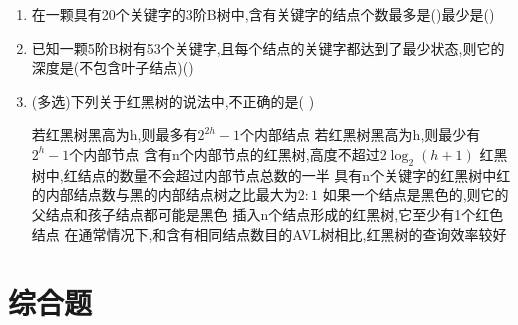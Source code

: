 \documentclass[12pt, a4paper, oneside, UTF8]{ctexbook}
\begin{document}
\begin{enumerate}
    \item 在一颗具有20个关键字的3阶B树中,含有关键字的结点个数最多是()最少是() 

    \item 已知一颗5阶B树有53个关键字,且每个结点的关键字都达到了最少状态,则它的深度是(不包含叶子结点)() 

    \item (多选)下列关于红黑树的说法中,不正确的是(   ) 
    \begin{choices}[1]
        \task 若红黑树黑高为h,则最多有$2^{2h}-1$个内部结点
        \task 若红黑树黑高为h,则最少有$2^h-1$个内部节点
        \task 含有n个内部节点的红黑树,高度不超过$2\log_2(h+1)$
        \task 红黑树中,红结点的数量不会超过内部节点总数的一半 
        \task 具有n个关键字的红黑树中红的内部结点数与黑的内部结点树之比最大为$2:1$ 
        \task 如果一个结点是黑色的,则它的父结点和孩子结点都可能是黑色 
        \task 插入n个结点形成的红黑树,它至少有1个红色结点 
        \task 在通常情况下,和含有相同结点数目的AVL树相比,红黑树的查询效率较好 
    \end{choices}
\end{enumerate}
\section{综合题}
\ifx\allfiles\undefined
\end{document}
